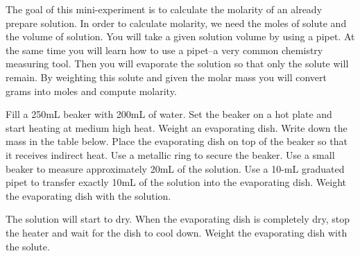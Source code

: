 \documentclass[main.tex]{subfiles}
\begin{document}
\vspace{0.2cm}{\large \bfseries 3. Molarity of a solution}
The goal of this mini-experiment is to calculate the molarity of an already prepare solution. In order to calculate molarity, we need the moles of solute and the volume of solution. You will take a given solution volume by using a pipet. At the same time you will learn how to use a pipet--a very common chemistry measuring tool. Then you will evaporate the solution so that only the solute will remain. By weighting this solute and given the molar mass you will convert grams into moles and compute molarity.
\begin{steps}
  \newstep[] Fill a 250mL beaker with 200mL of water. Set the beaker on a hot plate and start heating at medium high heat. 
      \newstep[] Weight an evaporating dish. Write down the mass in the table below.
 \newstep[] Place the evaporating dish on top of the beaker so that it receives indirect heat. Use a metallic ring to secure the beaker.
 \newstep[] Use a small beaker to measure approximately 20mL of the solution. Use a 10-mL graduated pipet to transfer exactly 10mL of the solution into the evaporating dish. Weight the evaporating dish with the solution.
  
   \newstep[] The solution will start to dry. When the evaporating dish is completely dry, stop the heater and wait for the dish to cool down. Weight the evaporating dish with the solute.
    
\end{steps}
\end{document}
